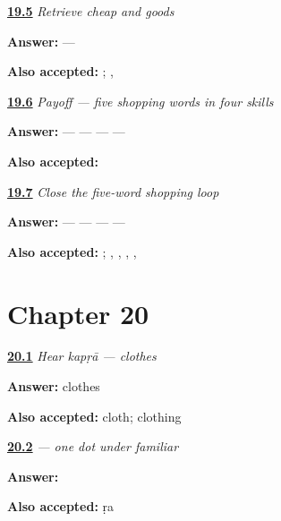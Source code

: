 \noindent\begin{minipage}[t]{\linewidth}
\raggedright
\hyperlink{review-MW-R14-shopping-new-two-recall}{\textbf{19.5}} \emph{Retrieve cheap and goods}\par
\small \textbf{Answer:}  — \par
\footnotesize \textbf{Also accepted:}  ; , 
\end{minipage}\par\medskip

\noindent\begin{minipage}[t]{\linewidth}
\raggedright
\hyperlink{review-MW-C14-shopping-five-payoff}{\textbf{19.6}} \emph{Payoff — five shopping words in four skills}\par
\small \textbf{Answer:}  —  —  —  — \par
\footnotesize \textbf{Also accepted:}     
\end{minipage}\par\medskip

\noindent\begin{minipage}[t]{\linewidth}
\raggedright
\hyperlink{review-MW-R14-shopping-close-recall}{\textbf{19.7}} \emph{Close the five-word shopping loop}\par
\small \textbf{Answer:}  —  —  —  — \par
\footnotesize \textbf{Also accepted:}     ; , , , , 
\end{minipage}\par\medskip

\section*{Chapter 20}

\noindent\begin{minipage}[t]{\linewidth}
\raggedright
\hyperlink{review-MW-C15-hear-kapda-meaning}{\textbf{20.1}} \emph{Hear \emph{kapṛā} — clothes}\par
\small \textbf{Answer:} clothes\par
\footnotesize \textbf{Also accepted:} cloth; clothing
\end{minipage}\par\medskip

\noindent\begin{minipage}[t]{\linewidth}
\raggedright
\hyperlink{review-MW-W15-nukta-write}{\textbf{20.2}} \emph{ — one dot under familiar }\par
\small \textbf{Answer:} \par
\footnotesize \textbf{Also accepted:}  ṛa
\end{minipage}\par\medskip


